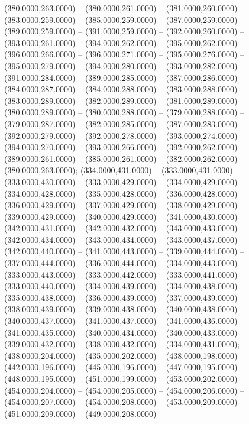 \begin{scope}[draw=black,fill=cd7191c,line join=round,line width=0.208pt]
   (380.0000,263.0000) -- (380.0000,261.0000) --
    (381.0000,260.0000) -- (383.0000,259.0000) -- (385.0000,259.0000) --
    (387.0000,259.0000) -- (389.0000,259.0000) -- (391.0000,259.0000) --
    (392.0000,260.0000) -- (393.0000,261.0000) -- (394.0000,262.0000) --
    (395.0000,262.0000) -- (396.0000,266.0000) -- (396.0000,271.0000) --
    (395.0000,276.0000) -- (395.0000,279.0000) -- (394.0000,280.0000) --
    (393.0000,282.0000) -- (391.0000,284.0000) -- (389.0000,285.0000) --
    (387.0000,286.0000) -- (384.0000,287.0000) -- (384.0000,288.0000) --
    (383.0000,288.0000) -- (383.0000,289.0000) -- (382.0000,289.0000) --
    (381.0000,289.0000) -- (380.0000,289.0000) -- (380.0000,288.0000) --
    (379.0000,288.0000) -- (379.0000,287.0000) -- (382.0000,285.0000) --
    (387.0000,283.0000) -- (392.0000,279.0000) -- (392.0000,278.0000) --
    (393.0000,274.0000) -- (394.0000,270.0000) -- (393.0000,266.0000) --
    (392.0000,262.0000) -- (389.0000,261.0000) -- (385.0000,261.0000) --
    (382.0000,262.0000) -- (380.0000,263.0000);
   (334.0000,431.0000) -- (333.0000,431.0000) --
    (333.0000,430.0000) -- (333.0000,429.0000) -- (334.0000,429.0000) --
    (334.0000,428.0000) -- (335.0000,428.0000) -- (336.0000,428.0000) --
    (336.0000,429.0000) -- (337.0000,429.0000) -- (338.0000,429.0000) --
    (339.0000,429.0000) -- (340.0000,429.0000) -- (341.0000,430.0000) --
    (342.0000,431.0000) -- (342.0000,432.0000) -- (343.0000,433.0000) --
    (342.0000,434.0000) -- (343.0000,434.0000) -- (343.0000,437.0000) --
    (342.0000,440.0000) -- (341.0000,443.0000) -- (339.0000,444.0000) --
    (337.0000,444.0000) -- (336.0000,444.0000) -- (334.0000,443.0000) --
    (333.0000,443.0000) -- (333.0000,442.0000) -- (333.0000,441.0000) --
    (333.0000,440.0000) -- (334.0000,439.0000) -- (334.0000,438.0000) --
    (335.0000,438.0000) -- (336.0000,439.0000) -- (337.0000,439.0000) --
    (338.0000,439.0000) -- (339.0000,438.0000) -- (340.0000,438.0000) --
    (340.0000,437.0000) -- (341.0000,437.0000) -- (341.0000,436.0000) --
    (341.0000,435.0000) -- (340.0000,434.0000) -- (340.0000,433.0000) --
    (339.0000,432.0000) -- (338.0000,432.0000) -- (334.0000,431.0000);
   (438.0000,204.0000) -- (435.0000,202.0000) --
    (438.0000,198.0000) -- (442.0000,196.0000) -- (445.0000,196.0000) --
    (447.0000,195.0000) -- (448.0000,195.0000) -- (451.0000,199.0000) --
    (453.0000,202.0000) -- (454.0000,204.0000) -- (454.0000,205.0000) --
    (454.0000,206.0000) -- (454.0000,207.0000) -- (454.0000,208.0000) --
    (453.0000,209.0000) -- (451.0000,209.0000) -- (449.0000,208.0000) --

\end{scope}
